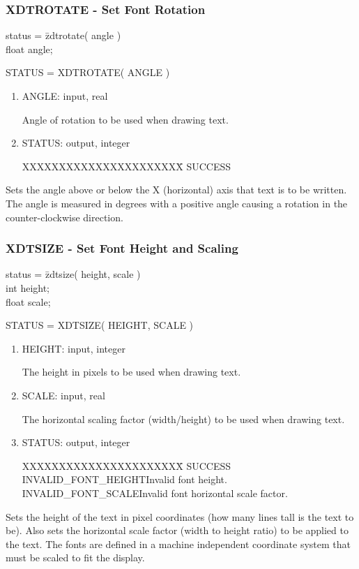 \subsubsection{XDTROTATE - Set Font Rotation}
\begin{tabbing}
status = \=zdtrotate( angle )\\
\>float  angle;\\
\end{tabbing}
STATUS = XDTROTATE( ANGLE )
\begin{enumerate}
\item ANGLE:  input, real

Angle of rotation to be used when drawing text.
\item STATUS:  output, integer
\begin{tabbing}
XXXXXXXXXXXXXXXXXXXXXX\=\kill
SUCCESS\\
\end{tabbing}
\end{enumerate}
Sets the angle above or below the X (horizontal) axis that text is to
be written.  The angle is measured in degrees with a positive angle
causing a rotation in the counter-clockwise direction.
\newpage
\subsubsection{XDTSIZE - Set Font Height and Scaling}
\begin{tabbing}
status = \=zdtsize( height, scale )\\
\>int  height;\\
\>float  scale;\\
\end{tabbing}
STATUS = XDTSIZE( HEIGHT, SCALE )
\begin{enumerate}
\item HEIGHT:  input, integer

The height in pixels to be used when drawing text.
\item SCALE:  input, real

The horizontal scaling factor (width/height) to be used when drawing
text.
\item STATUS:  output, integer
\begin{tabbing}
XXXXXXXXXXXXXXXXXXXXXX\=\kill
SUCCESS\\
INVALID\_FONT\_HEIGHT\>Invalid font height.\\
INVALID\_FONT\_SCALE\>Invalid font horizontal scale factor.\\
\end{tabbing}
\end{enumerate}
Sets the height of the text in pixel coordinates (how many lines tall
is the text to be).  Also sets the horizontal scale factor (width to
height ratio) to be applied to the text.  The fonts are defined in a
machine independent coordinate system that must be scaled to fit the
display.
\newpage
